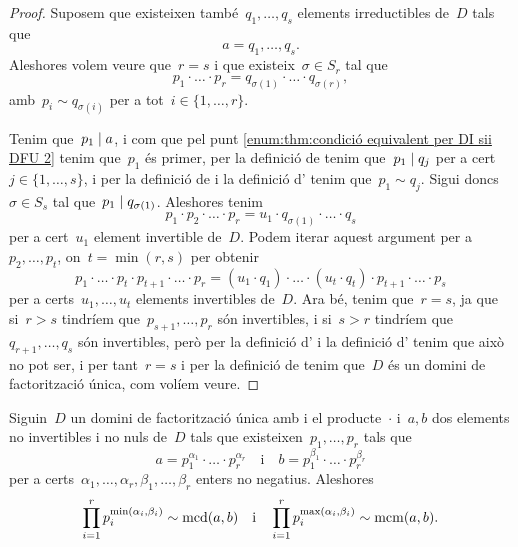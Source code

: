 \documentclass[../../main.tex]{subfiles}
\begin{document}
\begin{proof}
        Suposem que existeixen també~\(q_{1},\dots,q_{s}\) elements irreductibles de~\(D\) tals que
        \[
            a=q_{1},\dots,q_{s}.
        \]
        Aleshores volem veure que~\(r=s\) i que existeix~\(\sigma\in S_{r}\) tal que
        \[
            p_{1}\cdot\ldots\cdot p_{r}=q_{\sigma(1)}\cdot\ldots\cdot q_{\sigma(r)},
        \]
        amb~\(p_{i}\sim q_{\sigma(i)}\) per a tot~\(i\in\{1,\dots,r\}\).

        Tenim que~\(p_{1}\mathrel{|} a\), i com que pel punt \eqref{enum:thm:condició equivalent per DI sii DFU 2} tenim que~\(p_{1}\) és primer, per la definició de  tenim que~\(p_{1}\mathrel{|} q_{j}\) per a cert~\(j\in\{1,\dots,s\}\), i per la definició de  i la definició d' tenim que~\(p_{1}\sim q_{j}\).
        Sigui doncs~\(\sigma\in S_{s}\) tal que~\(p_{1}\mathrel{|} q_{\sigma(1)}\).
        Aleshores tenim
        \[
            p_{1}\cdot p_{2}\cdot\ldots\cdot p_{r}=u_{1}\cdot q_{\sigma(1)}\cdot\ldots\cdot q_{s}
        \]
        per a cert~\(u_{1}\) element invertible de~\(D\).
        Podem iterar aquest argument per a~\(p_{2},\dots,p_{t}\), on~\(t=\min(r,s)\) per obtenir
        \[
            p_{1}\cdot\ldots\cdot p_{t}\cdot p_{t+1}\cdot\ldots\cdot p_{r}=(u_{1}\cdot q_{1})\cdot\ldots\cdot(u_{t}\cdot q_{t})\cdot p_{t+1}\cdot\ldots \cdot p_{s}
        \]
        per a certs~\(u_{1},\dots, u_{t}\) elements invertibles de~\(D\).
        Ara bé, tenim que~\(r=s\), ja que si~\(r>s\) tindríem que~\(p_{s+1},\dots,p_{r}\) són invertibles, i si~\(s>r\) tindríem que~\(q_{r+1},\dots,q_{s}\) són invertibles, però per la definició d' i la definició d' tenim que això no pot ser, i per tant~\(r=s\) i per la definició de  tenim que~\(D\) és un domini de factorització única, com volíem veure.
    \end{proof}
    \begin{proposition}
        Siguin~\(D\) un domini de factorització única amb i el producte~\(\cdot\) i~\(a,b\) dos elements no invertibles i no nuls de~\(D\) tals que existeixen~\(p_{1},\dots,p_{r}\) tals que
        \[
            a=p_{1}^{\alpha_{1}}\cdot\ldots\cdot p_{r}^{\alpha_{r}}\quad\text{i}\quad b=p_{1}^{\beta_{1}}\cdot\ldots\cdot p_{r}^{\beta_{r}}
        \]
        per a certs~\(\alpha_{1},\dots,\alpha_{r},\beta_{1},\dots,\beta_{r}\) enters no negatius.
        Aleshores
        \[
            \prod_{i=1}^{r}p_{i}^{\min(\alpha_{i},\beta_{i})}\sim\operatorname{mcd}(a,b)\quad\text{i}\quad\prod_{i=1}^{r}p_{i}^{\max(\alpha_{i},\beta_{i})}\sim\operatorname{mcm}(a,b).
        \]
    \end{proposition}
\end{document}

